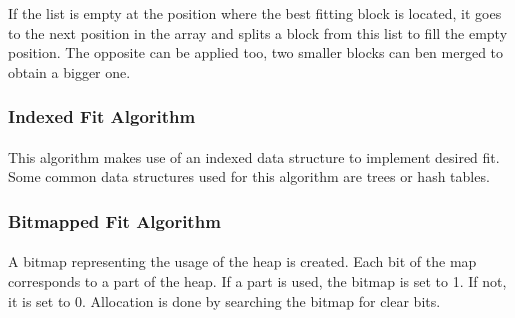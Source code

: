 If the list is empty at the position where the best fitting block is located, it goes to the next position in the array
and splits a block from this list to fill the empty position.
The opposite can be applied too, two smaller blocks can ben merged to obtain a bigger one.

\subsubsection{Indexed Fit Algorithm}
\paragraph{}
This algorithm makes use of an indexed data structure to implement desired fit.
Some common data structures used for this algorithm are trees or hash tables.

\subsubsection{Bitmapped Fit Algorithm}
\paragraph{}
A bitmap representing the usage of the heap is created.
Each bit of the map corresponds to a part of the heap.
If a part is used, the bitmap is set to 1.
If not, it is set to 0.
Allocation is done by searching the bitmap for clear bits.



